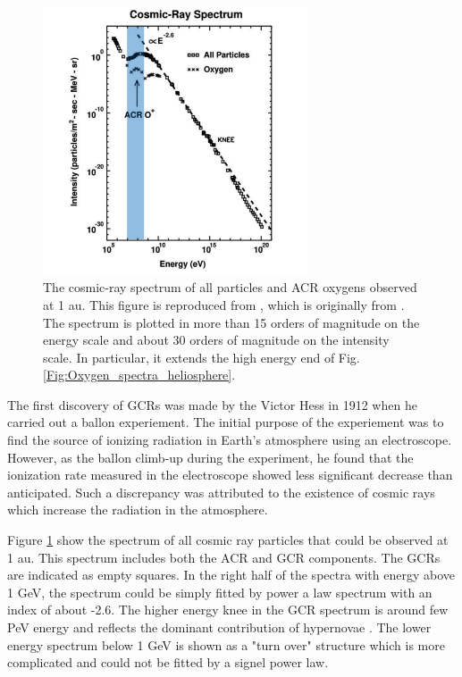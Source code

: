 \begin{figure}[htb]
	\centering
	\includegraphics[width = 0.7\textwidth]{images/gcr_spectra_shadow.png}
	\caption[The cosmic-ray spectrum of all particles at 1 au]{The cosmic-ray spectrum of all particles and \ac{ACR} oxygens observed at 1 au. This figure is reproduced from \citet{Giacalone2022SSRv, Giacalone2012SSRv}, which is originally from \citet{Jokipii1990AIPC}.
	The spectrum is plotted in more than 15 orders of magnitude on the energy scale and about 30 orders of magnitude on the intensity scale. In particular, it extends the high energy end of Fig.\ref{Fig:Oxygen_spectra_heliosphere}.}
	\label{Fig:Oxygen_spectra_cosmic_ray}
\end{figure}
The first discovery of \acp{GCR} was made by the Victor Hess in 1912 when he carried out a ballon experiement. The initial purpose of the experiement was to find the source of ionizing radiation in Earth's atmosphere using an electroscope. However, as the ballon climb-up during the experiment, he found that the ionization rate measured in the electroscope showed less significant decrease than anticipated. Such a discrepancy was attributed to the existence of cosmic rays which increase the radiation in the atmosphere.

Figure \ref{Fig:Oxygen_spectra_cosmic_ray} show the spectrum of all cosmic ray particles that could be observed at 1 au. This spectrum includes both the \ac{ACR} and \ac{GCR} components. The \acp{GCR} are indicated as empty squares. In the right half of the spectra with energy above 1 GeV, the spectrum could be simply fitted by power a law spectrum with an index of about -2.6. The higher energy knee in the \ac{GCR} spectrum is around few PeV energy and reflects the dominant contribution of hypernovae \citep{Sveshnikova2003AA, Hoerandel2003APh}. The lower energy spectrum  below 1 GeV is shown as a "turn over" structure which is more complicated and could not be fitted by a signel power law. 

